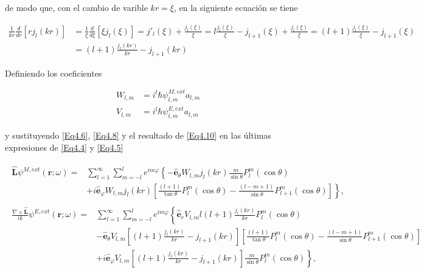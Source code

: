 \documentclass[a4paper,10pt]{article}
\newcommand{\hatbf}[1] {\hat{\mathbf{#1}}}	%
\begin{document}
de modo que, con el cambio de varible $kr=\xi$, en la siguiente ecuación se tiene

\begin{subequations}
\begin{align}
\frac{1}{kr}\frac{d}{dr}[rj_l(kr)]
&=\frac{1}{\xi}\frac{d}{d\xi}[\xi j_l(\xi)]=j'_l(\xi)+\frac{j_l(\xi)}{\xi}
=l\frac{j_l(\xi)}{\xi}-j_{l+1}(\xi)+\frac{j_l(\xi)}{\xi}
=(l+1)\frac{j_l(\xi)}{\xi}-j_{l+1}(\xi)	\\
&=(l+1)\frac{j_l(kr)}{kr}-j_{l+1}(kr)
\end{align}
\label{Eq4.10}
\end{subequations}

Definiendo los coeficientes

\begin{subequations}
\begin{align}
W_{l,m}		&=i^l	\hbar	\psi_{l,m}^{M,ext} a_{l,m}	\\
V_{l,m}		&=i^l	\hbar	\psi_{l,m}^{E,ext} a_{l,m}
\end{align}
\end{subequations}

y sustituyendo \eqref{Eq4.6}, \eqref{Eq4.8} y el resultado de \eqref{Eq4.10} en las últimas expresiones de \eqref{Eq4.4} y \eqref{Eq4.5}

\begin{subequations}
\begin{align}
\begin{split}
\hatbf{L}\psi^{M,ext}(\textbf{r};\omega)	
=&\sum_{l=1}^{\infty}\sum_{m=-l}^l e^{im\varphi}\left\{-\hatbf{e}_{\theta}W_{l,m}j_l(kr)\frac{m}{\sin\theta}P_l^m(\cos\theta)	\right.	\\
&\left. +i\hatbf{e}_{\varphi}W_{l,m}j_l(kr)\left[\frac{(l+1)}{\tan\theta}P_l^m(\cos\theta) -\frac{(l-m+1)}{\sin\theta}P_{l+1}^m(\cos\theta)\right]\right\},
\end{split}\\
\begin{split}
\frac{\nabla\times\hatbf{L}}{ik}\psi^{E,ext}(\textbf{r};\omega)
=&\sum_{l=1}^{\infty}\sum_{m=-l}^l e^{im\varphi}\left\{\hatbf{e}_r	V_{l,m}l(l+1)\frac{j_l(kr)}{kr}P_l^m(\cos\theta)\right.	\\
&-\hatbf{e}_{\theta}V_{l,m}\left[(l+1)\frac{j_l(kr)}{kr}-j_{l+1}(kr)\right]\left[\frac{(l+1)}{\tan\theta}P_l^m(\cos\theta)-\frac{(l-m+1)}{\sin\theta}P_{l+1}^m(\cos\theta)\right]	\\
&\left. +i\hatbf{e}_{\varphi}V_{l,m}\left[(l+1)\frac{j_l(kr)}{kr}-j_{l+1}(kr)\right]\frac{m}{\sin\theta}P_l^m(\cos\theta)	\right\},
\end{split}
\end{align}
\end{subequations}
\end{document}
